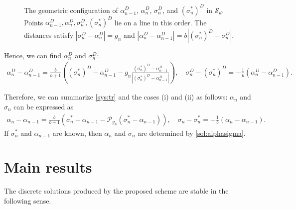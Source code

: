 \documentclass[11pt, a4paper]{article}
\newcommand{\Sym}{{\mathcal S}}
\newcommand{\Pop}[1]{\mathcal{P}_{#1}}
\newcommand{\sigmas}[1]{{\sigma_{#1}^*}}
\begin{document}
\begin{figure}[htp]\begin{center}
\caption{The geometric configuration of $\alpha_{n-1}^D$, $\alpha_n^D$, $\sigma_n^D$, and $(\sigma_n^*)^D$ in $\Sym_d$. Points $\alpha_{n-1}^D, \alpha_n^D, \sigma_n^D, (\sigma_n^*)^D$ lie on a line in this order. The distances satisfy
$|\sigma_n^D - \alpha_n^D| = g_n$ and $|\alpha_n^D - \alpha_{n-1}^D| = b|(\sigma_n^*)^D - \sigma_n^D|$.}\label{fig}
\end{center}\end{figure}
%
Hence, we can find $\alpha^D_n$ and $\sigma^D_n$:
\begin{align*}
    \alpha^D_n - \alpha^D_{n-1} 
    = \frac{b}{b+1}\left((\sigmas{n})^D - \alpha^D_{n-1} 
    - g_n\frac{(\sigmas{n})^D - \alpha^D_{n-1}}{|(\sigmas{n})^D - \alpha^D_{n-1}|}\right),\quad
    \sigma^D_n - (\sigmas{n})^D
    = - \frac{1}{b}(\alpha^D_n - \alpha^D_{n-1}).
\end{align*}

Therefore, we can summarize \eqref{sys:tr} and the cases (i) and (ii) as follows: $\alpha_n$ and $\sigma_n$ can be expressed as
\begin{align}\label{sol:alphasigma}
    \alpha_n - \alpha_{n-1} = \frac{b}{b+1}\left(\sigmas{n} - \alpha_{n-1} - \Pop{g_n}(\sigmas{n} - \alpha_{n-1})\right),
    \quad
    \sigma_n - \sigmas{n}
    = - \frac{1}{b}(\alpha_n - \alpha_{n-1}).
\end{align}
If $\sigmas{n}$ and $\alpha_{n-1}$ are known, then $\alpha_n$ and $\sigma_n$ are determined by \eqref{sol:alphasigma}.

\section{Main results}

The discrete solutions produced by the proposed scheme are stable in the following sense.
\end{document}
